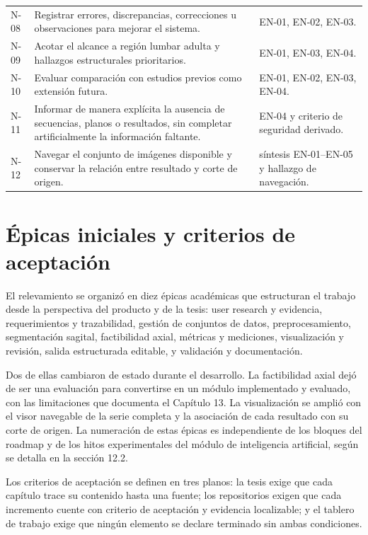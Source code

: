 {\begin{longtable}{>{\raggedright\arraybackslash}p{} >{\raggedright\arraybackslash}p{} >{\raggedright\arraybackslash}p{}}
N-08 & Registrar errores, discrepancias, correcciones u observaciones para mejorar el sistema. & EN-01, EN-02, EN-03. \\
N-09 & Acotar el alcance a región lumbar adulta y hallazgos estructurales prioritarios. & EN-01, EN-03, EN-04. \\
N-10 & Evaluar comparación con estudios previos como extensión futura. & EN-01, EN-02, EN-03, EN-04. \\
N-11 & Informar de manera explícita la ausencia de secuencias, planos o resultados, sin completar artificialmente la información faltante. & EN-04 y criterio de seguridad derivado. \\
N-12 & Navegar el conjunto de imágenes disponible y conservar la relación entre resultado y corte de origen. & síntesis EN-01–EN-05 y hallazgo de navegación. \\
\hline
\end{longtable}
}

\section{Épicas iniciales y criterios de aceptación}

El relevamiento se organizó en diez épicas académicas que estructuran el trabajo desde la perspectiva del producto y de la tesis: user research y evidencia, requerimientos y trazabilidad, gestión de conjuntos de datos, preprocesamiento, segmentación sagital, factibilidad axial, métricas y mediciones, visualización y revisión, salida estructurada editable, y validación y documentación.

Dos de ellas cambiaron de estado durante el desarrollo. La factibilidad axial dejó de ser una evaluación para convertirse en un módulo implementado y evaluado, con las limitaciones que documenta el Capítulo 13. La visualización se amplió con el visor navegable de la serie completa y la asociación de cada resultado con su corte de origen. La numeración de estas épicas es independiente de los bloques del roadmap y de los hitos experimentales del módulo de inteligencia artificial, según se detalla en la sección 12.2.

Los criterios de aceptación se definen en tres planos: la tesis exige que cada capítulo trace su contenido hasta una fuente; los repositorios exigen que cada incremento cuente con criterio de aceptación y evidencia localizable; y el tablero de trabajo exige que ningún elemento se declare terminado sin ambas condiciones.

